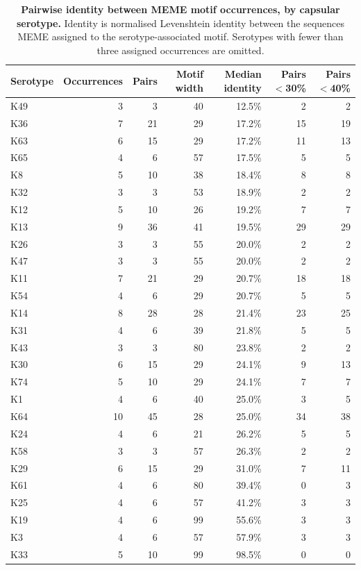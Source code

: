 \begin{table}[h]
\centering
\caption{{\bf Pairwise identity between MEME motif occurrences, by capsular serotype.} Identity is normalised Levenshtein identity between the sequences MEME assigned to the serotype-associated motif. Serotypes with fewer than three assigned occurrences are omitted.}
\begin{tabular}{lrrrrrr}
\hline
Serotype & Occurrences & Pairs & Motif width & Median identity & Pairs $<$30\% & Pairs $<$40\% \\
\hline
K49 & 3 & 3 & 40 & 12.5\% & 2 & 2 \\
K36 & 7 & 21 & 29 & 17.2\% & 15 & 19 \\
K63 & 6 & 15 & 29 & 17.2\% & 11 & 13 \\
K65 & 4 & 6 & 57 & 17.5\% & 5 & 5 \\
K8 & 5 & 10 & 38 & 18.4\% & 8 & 8 \\
K32 & 3 & 3 & 53 & 18.9\% & 2 & 2 \\
K12 & 5 & 10 & 26 & 19.2\% & 7 & 7 \\
K13 & 9 & 36 & 41 & 19.5\% & 29 & 29 \\
K26 & 3 & 3 & 55 & 20.0\% & 2 & 2 \\
K47 & 3 & 3 & 55 & 20.0\% & 2 & 2 \\
K11 & 7 & 21 & 29 & 20.7\% & 18 & 18 \\
K54 & 4 & 6 & 29 & 20.7\% & 5 & 5 \\
K14 & 8 & 28 & 28 & 21.4\% & 23 & 25 \\
K31 & 4 & 6 & 39 & 21.8\% & 5 & 5 \\
K43 & 3 & 3 & 80 & 23.8\% & 2 & 2 \\
K30 & 6 & 15 & 29 & 24.1\% & 9 & 13 \\
K74 & 5 & 10 & 29 & 24.1\% & 7 & 7 \\
K1 & 4 & 6 & 40 & 25.0\% & 3 & 5 \\
K64 & 10 & 45 & 28 & 25.0\% & 34 & 38 \\
K24 & 4 & 6 & 21 & 26.2\% & 5 & 5 \\
K58 & 3 & 3 & 57 & 26.3\% & 2 & 2 \\
K29 & 6 & 15 & 29 & 31.0\% & 7 & 11 \\
K61 & 4 & 6 & 80 & 39.4\% & 0 & 3 \\
K25 & 4 & 6 & 57 & 41.2\% & 3 & 3 \\
K19 & 4 & 6 & 99 & 55.6\% & 3 & 3 \\
K3 & 4 & 6 & 57 & 57.9\% & 3 & 3 \\
K33 & 5 & 10 & 99 & 98.5\% & 0 & 0 \\
\hline
\end{tabular}
\label{tab:motif_identity}
\end{table}
